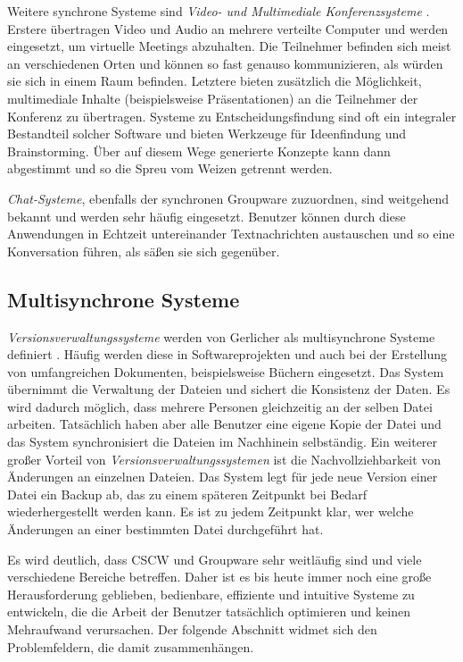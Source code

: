 Weitere synchrone Systeme sind \emph{Video- und Multimediale Konferenzsysteme} \citep{Gerlicher:2007p241}. Erstere übertragen Video und Audio an mehrere verteilte Computer und werden eingesetzt, um virtuelle Meetings abzuhalten. Die Teilnehmer befinden sich meist an verschiedenen Orten und können so fast genauso kommunizieren, als würden sie sich in einem Raum befinden. Letztere bieten zusätzlich die Möglichkeit, multimediale Inhalte (beispielsweise Präsentationen) an die Teilnehmer der Konferenz zu übertragen. Systeme zu Entscheidungsfindung sind oft ein integraler Bestandteil solcher Software und bieten Werkzeuge für Ideenfindung und Brainstorming. Über auf diesem Wege generierte Konzepte kann dann abgestimmt und so die Spreu vom Weizen getrennt werden. 

\emph{Chat-Systeme}, ebenfalls der synchronen Groupware zuzuordnen, sind weitgehend bekannt und werden sehr häufig eingesetzt. Benutzer können durch diese Anwendungen in Echtzeit untereinander Textnachrichten austauschen und so eine Konversation führen, als säßen sie sich gegenüber. 

\subsection{Multisynchrone Systeme}\label{sec:multisynchronousCSCW}

\emph{Versionsverwaltungssysteme} werden von Gerlicher als multisynchrone Systeme definiert \citep{Gerlicher:2007p241}. Häufig werden diese in Softwareprojekten und auch bei der Erstellung von umfangreichen Dokumenten, beispielsweise Büchern eingesetzt. Das System übernimmt die Verwaltung der Dateien und sichert die Konsistenz der Daten. Es wird dadurch möglich, dass mehrere Personen gleichzeitig an der selben Datei arbeiten. Tatsächlich haben aber alle Benutzer eine eigene Kopie der Datei und das System synchronisiert die Dateien im Nachhinein selbständig. Ein weiterer großer Vorteil von \emph{Versionsverwaltungssystemen} ist die Nachvollziehbarkeit von Änderungen \citep{Gerlicher:2007p241} an einzelnen Dateien. Das System legt für jede neue Version einer Datei ein Backup ab, das zu einem späteren Zeitpunkt bei Bedarf wiederhergestellt werden kann. Es ist zu jedem Zeitpunkt klar, wer welche Änderungen an einer bestimmten Datei durchgeführt hat. 

\bigskip Es wird deutlich, dass \ac{CSCW} und Groupware sehr weitläufig sind und viele verschiedene Bereiche betreffen. Daher ist es bis heute immer noch eine große Herausforderung geblieben, bedienbare, effiziente und intuitive Systeme zu entwickeln, die die Arbeit der Benutzer tatsächlich optimieren und keinen Mehraufwand verursachen. Der folgende Abschnitt widmet sich den Problemfeldern, die damit zusammenhängen.

